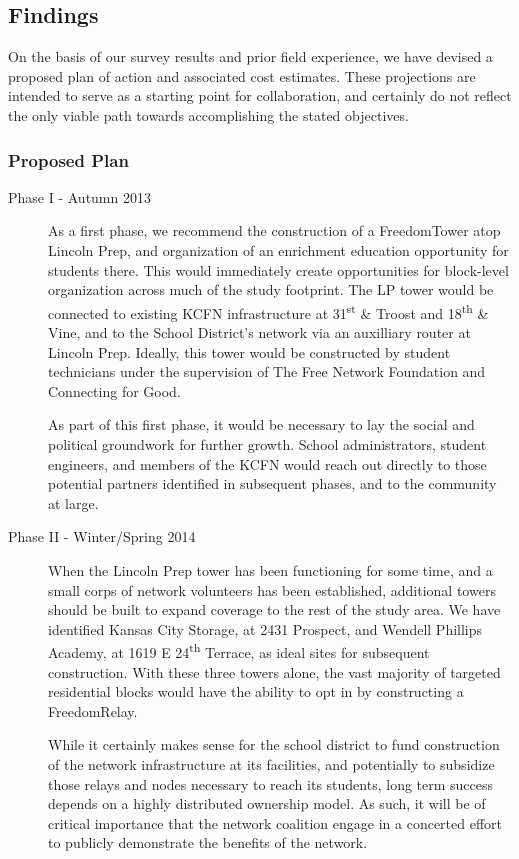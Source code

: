 \subsection{Findings}
On the basis of our survey results and prior field experience, we have devised
a proposed plan of action and associated cost estimates. These projections are intended
to serve as a starting point for collaboration, and certainly do not reflect the
only viable path towards accomplishing the stated objectives.\par

\subsubsection{Proposed Plan}
\begin{description}
\item[Phase I - Autumn 2013]
As a first phase, we recommend the construction of a FreedomTower atop Lincoln
Prep, and organization of an enrichment education opportunity for
students there. This would immediately create opportunities for block-level
organization across much of the study footprint. The LP tower would be
connected to existing KCFN infrastructure at 31\textsuperscript{st} \& Troost
and 18\textsuperscript{th}
\& Vine, and to the School District's network via an auxilliary router at
Lincoln Prep. Ideally, this tower would be constructed by student technicians
under the supervision of The Free Network Foundation and Connecting for Good. \par
As part of this first phase, it would be necessary to lay the social and
political groundwork for further growth. School administrators, student
engineers, and members of the KCFN would reach out directly to those potential
partners identified in subsequent phases, and to the community at large. \par

\item[Phase II - Winter/Spring 2014]
When the Lincoln Prep tower has been functioning for some time, and a small
corps of network volunteers has been established, additional towers should be
built to expand coverage to the rest of the study area. We have identified
Kansas City Storage, at 2431 Prospect, and Wendell Phillips Academy, at 1619 E
24\textsuperscript{th} Terrace, as ideal sites for subsequent construction. With these three
towers alone, the vast majority of targeted residential blocks would have the
ability to opt in by constructing a FreedomRelay. \par
While it certainly makes sense for the school district to fund  construction
of the network infrastructure at its facilities, and potentially to subsidize
those relays and nodes necessary to reach its students, long term success
depends on a highly distributed ownership model. As such, it will be of critical
importance that the network coalition engage in a concerted 
effort to publicly demonstrate the benefits of the network.\par


\end{description}
